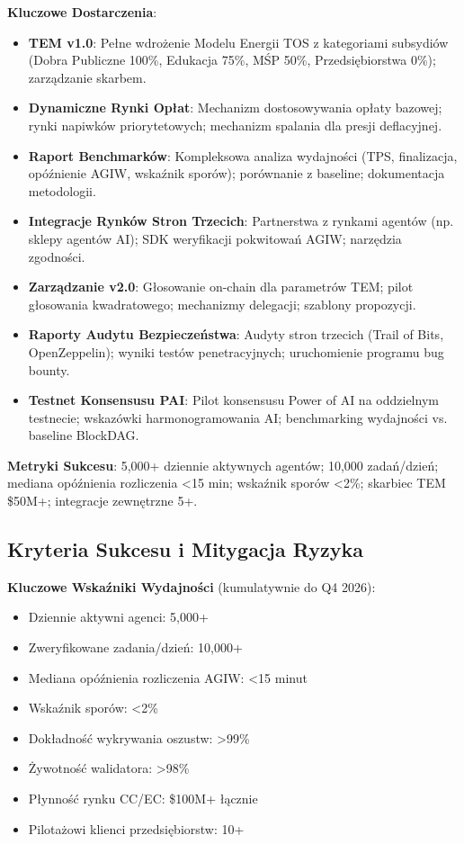\documentclass[11pt]{article}
\begin{document}
\textbf{Kluczowe Dostarczenia}:
\begin{itemize}[noitemsep]
  \item \textbf{TEM v1.0}: Pełne wdrożenie Modelu Energii TOS z kategoriami subsydiów (Dobra Publiczne 100\%, Edukacja 75\%, MŚP 50\%, Przedsiębiorstwa 0\%); zarządzanie skarbem.
  \item \textbf{Dynamiczne Rynki Opłat}: Mechanizm dostosowywania opłaty bazowej; rynki napiwków priorytetowych; mechanizm spalania dla presji deflacyjnej.
  \item \textbf{Raport Benchmarków}: Kompleksowa analiza wydajności (TPS, finalizacja, opóźnienie AGIW, wskaźnik sporów); porównanie z baseline; dokumentacja metodologii.
  \item \textbf{Integracje Rynków Stron Trzecich}: Partnerstwa z rynkami agentów (np. sklepy agentów AI); SDK weryfikacji pokwitowań AGIW; narzędzia zgodności.
  \item \textbf{Zarządzanie v2.0}: Głosowanie on-chain dla parametrów TEM; pilot głosowania kwadratowego; mechanizmy delegacji; szablony propozycji.
  \item \textbf{Raporty Audytu Bezpieczeństwa}: Audyty stron trzecich (Trail of Bits, OpenZeppelin); wyniki testów penetracyjnych; uruchomienie programu bug bounty.
  \item \textbf{Testnet Konsensusu PAI}: Pilot konsensusu Power of AI na oddzielnym testnecie; wskazówki harmonogramowania AI; benchmarking wydajności vs. baseline BlockDAG.
\end{itemize}

\textbf{Metryki Sukcesu}: 5,000+ dziennie aktywnych agentów; 10,000 zadań/dzień; mediana opóźnienia rozliczenia <15 min; wskaźnik sporów <2\%; skarbiec TEM \$50M+; integracje zewnętrzne 5+.

\subsection{Kryteria Sukcesu i Mitygacja Ryzyka}

\textbf{Kluczowe Wskaźniki Wydajności} (kumulatywnie do Q4 2026):
\begin{itemize}[noitemsep]
  \item Dziennie aktywni agenci: 5,000+
  \item Zweryfikowane zadania/dzień: 10,000+
  \item Mediana opóźnienia rozliczenia AGIW: <15 minut
  \item Wskaźnik sporów: <2\%
  \item Dokładność wykrywania oszustw: >99\%
  \item Żywotność walidatora: >98\%
  \item Płynność rynku CC/EC: \$100M+ łącznie
  \item Pilotażowi klienci przedsiębiorstw: 10+
\end{itemize}
\end{document}
